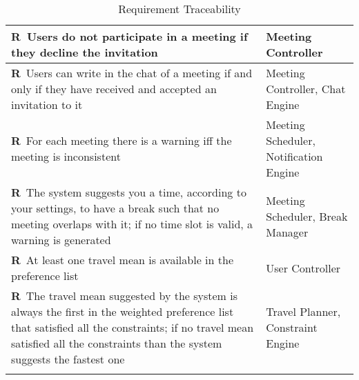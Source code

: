 \begin{longtable}{|m{7cm}|m{7cm}|}
	\textbf{R\reqNum}~Users do not participate in a meeting if they decline the invitation & Meeting Controller	\\ \hline
	\textbf{R\reqNum}~Users can write in the chat of a meeting if and only if they have received and accepted an invitation to it & Meeting Controller, Chat Engine	\\ \hline
	\textbf{R\reqNum}~For each meeting there is a warning iff the meeting is inconsistent & Meeting Scheduler, Notification Engine \\ \hline
	\textbf{R\reqNum}~The system suggests you a time, according to your settings, to have a break such that no meeting overlaps with it; if no time slot is valid, a warning is generated & Meeting Scheduler, Break Manager	\\ \hline
	\textbf{R\reqNum}~At least one travel mean is available in the preference list & User Controller	\\ \hline
	\textbf{R\reqNum}~The travel mean suggested by the system is always the first in the weighted preference list that satisfied all the constraints; if no travel mean satisfied all the constraints than the system suggests the fastest one & Travel Planner, Constraint Engine	\\ \hline
	\caption{Requirement Traceability}
\end{longtable}
